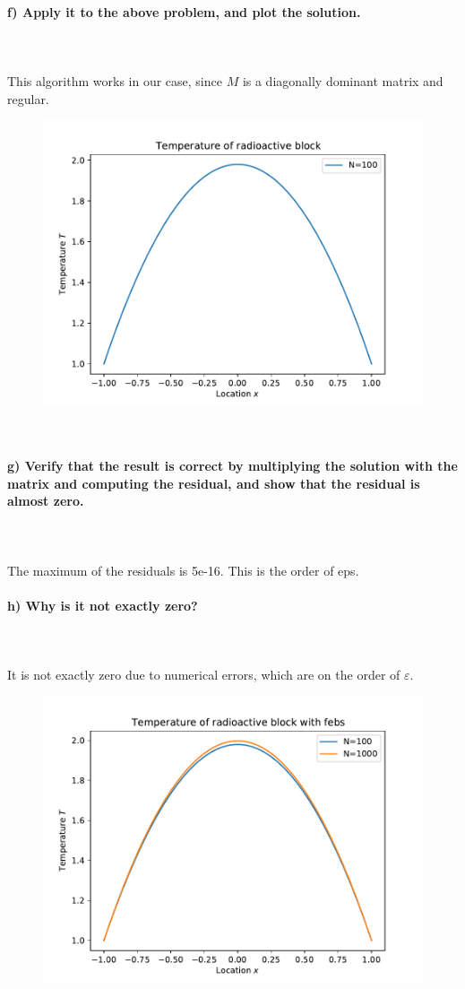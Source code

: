 \paragraph{
    f) Apply it to the above problem, and plot the solution.
} \ \\
    \\
    This algorithm works in our case, since $M$ is a diagonally
    dominant matrix and regular.
    \begin{figure}[h!]
        \centering
        \includegraphics[width=.7\textwidth]{../figures/Aufg1f.pdf}
    \end{figure} \ \\

\paragraph{
    g) Verify that the result is correct by multiplying the solution
    with the matrix and computing the residual, and show that the
    residual is almost zero.
} \ \\
    \\
    The maximum of the residuals is 5e-16. This is the order of eps.

\paragraph{
    h) Why is it not exactly zero?
} \ \\
    \\
    It is not exactly zero due to numerical errors, 
    which are on the order of $\varepsilon$.
    \begin{figure}[h!]
        \centering
        \includegraphics[width=.7\textwidth]{../figures/Aufg1h.pdf}
    \end{figure} \ \\ 

